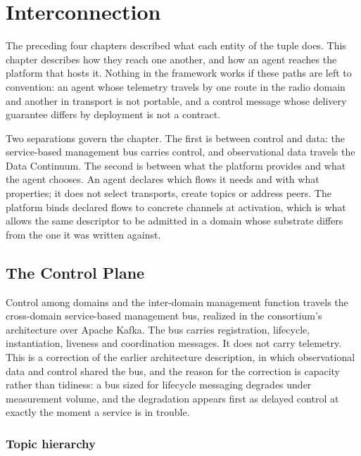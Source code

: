 
\hypertarget{interconnection}{%
\section{Interconnection}\label{interconnection}}

The preceding four chapters described what each entity of the tuple
does. This chapter describes how they reach one another, and how an
agent reaches the platform that hosts it. Nothing in the framework works
if these paths are left to convention: an agent whose telemetry travels
by one route in the radio domain and another in transport is not
portable, and a control message whose delivery guarantee differs by
deployment is not a contract.

Two separations govern the chapter. The first is between control and
data: the service-based management bus carries control, and
observational data travels the Data Continuum. The second is between
what the platform provides and what the agent chooses. An agent declares
which flows it needs and with what properties; it does not select
transports, create topics or address peers. The platform binds declared
flows to concrete channels at activation, which is what allows the same
descriptor to be admitted in a domain whose substrate differs from the
one it was written against.

\hypertarget{the-control-plane}{%
\subsection{The Control Plane}\label{the-control-plane}}

Control among domains and the inter-domain management function travels
the cross-domain service-based management bus, realized in the
consortium's architecture over Apache Kafka. The bus carries
registration, lifecycle, instantiation, liveness and coordination
messages. It does not carry telemetry. This is a correction of the
earlier architecture description, in which observational data and
control shared the bus, and the reason for the correction is capacity
rather than tidiness: a bus sized for lifecycle messaging degrades under
measurement volume, and the degradation appears first as delayed control
at exactly the moment a service is in trouble.

\hypertarget{topic-hierarchy}{%
\subsubsection{Topic hierarchy}\label{topic-hierarchy}}

